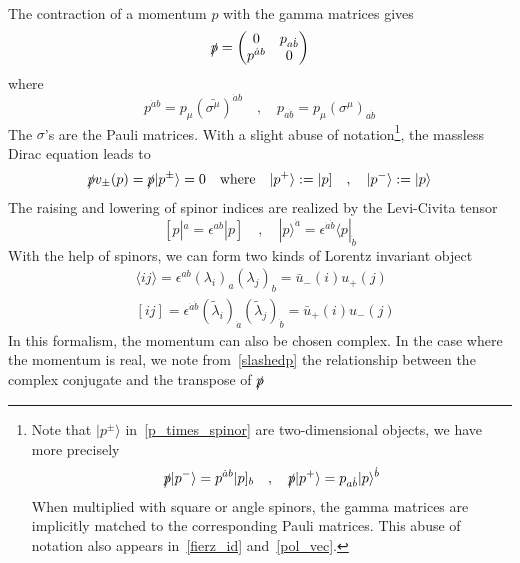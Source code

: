 \\
The contraction of a momentum $p$ with the gamma matrices gives
\begin{equation}\label{slashedp}
\slashed{p} = \begin{pmatrix}
0 & p_{a\dot{b}} \\ 
p^{\dot{a}b} & 0
\end{pmatrix}
\end{equation}
where 
\begin{equation}
p^{\dot{a}b} = p_\mu(\bar{\sigma^\mu})^{\dot{a}b}
\quad,\quad
p_{a\dot{b}} = p_\mu(\sigma^\mu)_{a\dot{b}}
\end{equation}
The $\sigma$'s are the Pauli matrices.
With a slight abuse of notation\footnote{
Note that $|p^\pm\rangle$ in~\cref{p_times_spinor} are two-dimensional objects, we have more precisely
\begin{equation}
\slashed{p}|p^-\rangle = p^{\dot{a}b}|p]_b
\quad,\quad
\slashed{p}|p^+\rangle = p_{a\dot{b}}|p\rangle^{\dot{b}}
\end{equation}
When multiplied with square or angle spinors, the gamma matrices are implicitly matched to the corresponding Pauli matrices.
This abuse of notation also appears in~\cref{fierz_id} and~\cref{pol_vec}.
}, the massless Dirac equation leads to
\begin{equation}\label{p_times_spinor}
\slashed{p}v_\pm (p) = \slashed{p}|p^\pm\rangle = 0
\quad \mathrm{where}\quad
|p^+\rangle := |p]
\quad,\quad
|p^-\rangle := |p\rangle
\end{equation}
The raising and lowering of spinor indices are realized by the Levi-Civita tensor
\begin{equation}\label{levi-civita}
[p|^a = \epsilon^{ab}|p] \quad,\quad
|p\rangle^{\dot{a}} = \epsilon^{\dot{a}\dot{b}}\langle p |_{\dot{b}}
\end{equation}
With the help of spinors, we can form two kinds of Lorentz invariant object
\begin{equation}\label{spinor_pdt}
\begin{split}
& \langle ij \rangle = \epsilon^{ab}(\lambda_i)_a(\lambda_j)_b = \bar{u}_-(i)u_+(j)
\\
& [ij] = \epsilon^{\dot{a}\dot{b}}(\tilde{\lambda}_i)_{\dot{a}}(\tilde{\lambda}_j)_{\dot{b}} = \bar{u}_+(i)u_-(j)
\end{split}
\end{equation}
In this formalism, the momentum can also be chosen complex. 
In the case where the momentum is real, we note from~\cref{slashedp} the relationship between the complex conjugate and the transpose of $\slashed{p}$
